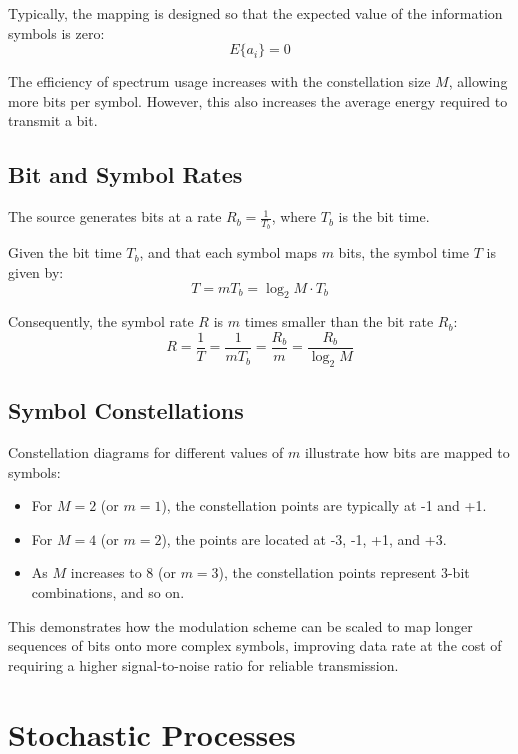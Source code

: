 Typically, the mapping is designed so that the expected value of the information symbols is zero:
\[ E\{a_i\} = 0 \]

The efficiency of spectrum usage increases with the constellation size \( M \), allowing more bits per symbol. However, this also increases the average energy required to transmit a bit.

\subsection*{Bit and Symbol Rates}

The source generates bits at a rate \( R_b = \frac{1}{T_b} \), where \( T_b \) is the bit time.

Given the bit time \( T_b \), and that each symbol maps \( m \) bits, the symbol time \( T \) is given by:
\[ T = mT_b = \log_2 M \cdot T_b \]

Consequently, the symbol rate \( R \) is \( m \) times smaller than the bit rate \( R_b \):
\[ R = \frac{1}{T} = \frac{1}{mT_b} = \frac{R_b}{m} = \frac{R_b}{\log_2 M} \]

\subsection*{Symbol Constellations}

Constellation diagrams for different values of \( m \) illustrate how bits are mapped to symbols:
\begin{itemize}
    \item For \( M = 2 \) (or \( m = 1 \)), the constellation points are typically at -1 and +1.
    \item For \( M = 4 \) (or \( m = 2 \)), the points are located at -3, -1, +1, and +3.
    \item As \( M \) increases to 8 (or \( m = 3 \)), the constellation points represent 3-bit combinations, and so on.
\end{itemize}
This demonstrates how the modulation scheme can be scaled to map longer sequences of bits onto more complex symbols, improving data rate at the cost of requiring a higher signal-to-noise ratio for reliable transmission.


\section*{Stochastic Processes}

